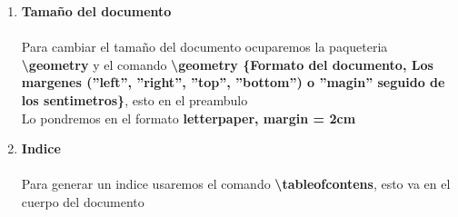 \documentclass[spanish,12pt,a4paper]{book}%
\begin{document}
\begin{enumerate}
\begin{enumerate}
\begin{itemize}
 			\item  \textbackslash end \{thebibliography\}
 		\end{itemize}
 		Para citar en el texto usaremos el comando \textbf{\textbackslash cite \{Aqui el nombre unico que se le puso a la cita\}}
 		\item Bibtex
    	\\Para la forma de citar con este entorno revisar el marcador del Pdf
 	\end{enumerate}
\item \textbf{Tamaño del documento}\\\\
	Para cambiar el tamaño del documento ocuparemos la paqueteria \textbf{\textbackslash geometry} y el comando \textbf{\textbackslash geometry \{Formato del documento, Los margenes (''left'', ''right'', ''top'', ''bottom'') o ''magin'' seguido de los sentimetros\}}, esto en el preambulo\\
	Lo pondremos en el formato \textbf{letterpaper, margin = 2cm}\\
\item \textbf{Indice}\\\\
	Para generar un indice usaremos el comando \textbf{\textbackslash tableofcontens}, esto va en el cuerpo del documento


\end{enumerate}
\end{document}
